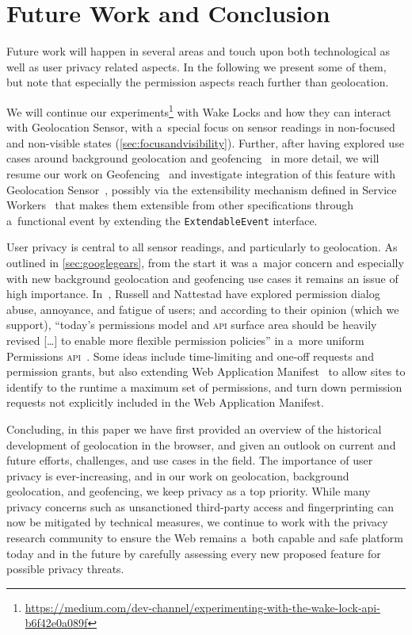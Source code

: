 \documentclass[sigconf,hyphens]{acmart}
\begin{document}
\section{Future Work and Conclusion}

Future work will happen in several areas and touch upon both technological
as well as user privacy related aspects.
In the following we present some of them,
but note that especially the permission aspects reach further than geolocation.

We will continue our
experiments\footnote{\url{https://medium.com/dev-channel/experimenting-with-the-wake-lock-api-b6f42e0a089f}} 
with Wake Locks and how they can interact with Geolocation Sensor,
with a~special focus on sensor readings in non-focused and non-visible states (\autoref{sec:focusandvisibility}).
Further, after having explored use cases around background geolocation
and geofencing~\cite{kostiainen2018geolocation} in more detail,
we will resume our work on Geofencing~\cite{kruisselbrink2017geofencing}
and investigate integration of this feature with Geolocation Sensor~\cite{kostiainen2018geolocation},
possibly via the extensibility mechanism defined in Service Workers~\cite{russell2017serviceworkers}
that makes them extensible from other specifications through a~functional event
by extending the \texttt{ExtendableEvent} interface.

User privacy is central to all sensor readings, and particularly to geolocation.
As outlined in \autoref{sec:googlegears}, from the start it was a~major concern
and especially with new background geolocation and geofencing use cases
it remains an issue of high importance.
In~\cite{russell2018permissions}, Russell and Nattestad have explored permission dialog
abuse, annoyance, and fatigue of users; and according to their opinion (which we support),
``today's permissions model and \textsc{api} surface area should be heavily revised
[\ldots] to enable more flexible permission policies'' in a~more uniform
Permissions \textsc{api}~\cite{lamouri2017permissions}.
Some ideas include time-limiting and one-off requests and permission grants, but also
extending Web Application Manifest~\cite{caceres2018manifest}
to allow sites to identify to the runtime a maximum set of permissions,
and turn down permission requests not explicitly included in the Web Application Manifest.

Concluding, in this paper we have first provided an overview
of the historical development of geolocation in the browser,
and given an outlook on current and future efforts, challenges, and use cases in the field.
The importance of user privacy is ever-increasing, and in our work on geolocation,
background geolocation, and geofencing,
we keep privacy as a top priority.
While many privacy concerns such as unsanctioned third-party access and fingerprinting
can now be mitigated by technical measures, we continue to work with the privacy research community
to ensure the Web remains a~both capable and safe platform today and in the future
by carefully assessing every new proposed feature for possible privacy threats.



\end{document}
